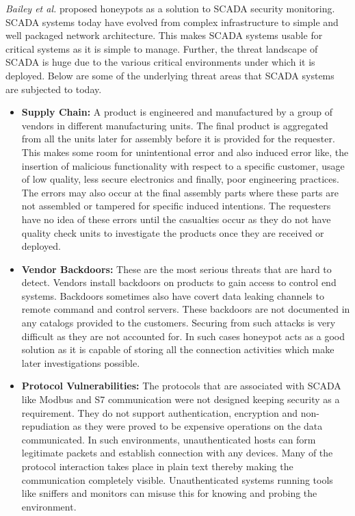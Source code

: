 \documentclass[article,msc=informatik,type=msc,colorback,accentcolor=tud9c]{tudthesis}
\begin{document}
		\vspace{5mm}
	 \textit{Bailey et al.} \cite{conf/bwcca/DissoJB13} proposed honeypots as a solution to \ac{SCADA} security monitoring. \ac{SCADA} systems today have evolved from complex infrastructure to simple and well packaged network architecture. This makes \ac{SCADA} systems usable for critical systems as it is simple to manage. Further, the threat landscape of \ac{SCADA} is huge due to the various critical environments under which it is deployed.  Below are some of the underlying threat areas that \ac{SCADA} systems are subjected to today.
	 \vspace{5mm}
	 \begin{itemize}
	 
	 
	 \item\textbf{Supply Chain:} A product is engineered and manufactured by a group of vendors in different manufacturing units. The final product is aggregated from all the units later for assembly before it is provided for the requester. This makes some room for unintentional error and also induced error like, the insertion of  malicious functionality with respect to a specific customer, usage of low quality, less secure electronics and finally, poor engineering practices. The errors may also occur at the final assembly parts where these parts are not assembled or tampered for specific induced intentions. The requesters have no idea of these errors until the casualties occur as they do not have quality check units to investigate the products once they are received or deployed. 
	 \vspace{5mm}
	 \item\textbf{Vendor Backdoors:} These are the most serious threats that are hard to detect. Vendors install backdoors\cite{SANSVendor} on products to gain access to control end systems. Backdoors sometimes also have covert data leaking channels to remote command and control servers. These backdoors are not documented in any catalogs provided to the customers. Securing from such attacks is very difficult as they are not accounted for. In such cases honeypot acts as a good solution as it is capable of storing all the connection activities which make later investigations possible.
	 \vspace{5mm}
	 \item\textbf{Protocol Vulnerabilities:} The protocols that are associated with SCADA like Modbus and S7 communication were not designed keeping security as a requirement. They do not support authentication, encryption and non-repudiation as they were proved to be expensive operations on the data communicated. In such environments, unauthenticated hosts can form legitimate packets and establish connection with any devices. Many of the protocol interaction takes place in plain text thereby making the communication completely visible. Unauthenticated systems running tools like sniffers and monitors can misuse this for knowing and probing the environment.

\end{itemize}
\end{document}
